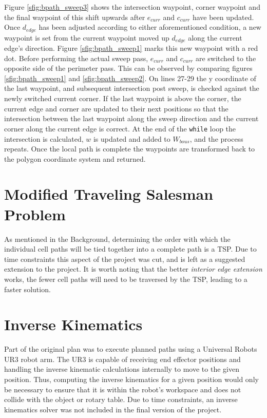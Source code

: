 Figure \ref{sfig:bpath_sweep3} shows the intersection waypoint, corner waypoint and the final waypoint of this shift upwards after $e_{curr}$ and $c_{curr}$ have been updated.
Once $d_{edge}$ has been adjusted according to either aforementioned condition, a new waypoint is set from the current waypoint moved up $d_{edge}$ along the current edge's direction.
Figure \ref{sfig:bpath_sweep1} marks this new waypoint with a red dot.
Before performing the actual sweep pass, $e_{curr}$ and $c_{curr}$ are switched to the opposite side of the perimeter pass.
This can be observed by comparing figures \ref{sfig:bpath_sweep1} and \ref{sfig:bpath_sweep2}.
On lines 27-29 the y coordinate of the last waypoint, and subsequent intersection post sweep, is checked against the newly switched current corner.
If the last waypoint is above the corner, the current edge and corner are updated to their next positions so that the intersection between the last waypoint along the sweep direction and the current corner along the current edge is correct.
At the end of the \verb|while| loop the intersection is calculated, $w$ is updated and added to $W_{bous}$, and the process repeats.
Once the local path is complete the waypoints are transformed back to the polygon coordinate system and returned.

\iftrue
\section{Modified Traveling Salesman Problem}
As mentioned in the Background, determining the order with which the individual cell paths will be tied together into a complete path is a TSP.
Due to time constraints this aspect of the project was cut, and is left as a suggested extension to the project.
It is worth noting that the better \textit{interior edge extension} works, the fewer cell paths will need to be traversed by the TSP, leading to a faster solution.
\fi

\section{Inverse Kinematics}
Part of the original plan was to execute planned paths using a Universal Robots UR3 robot arm.
The UR3 is capable of receiving end effector positions and handling the inverse kinematic calculations internally to move to the given position.
Thus, computing the inverse kinematics for a given position would only be necessary to ensure that it is within the robot's workspace and does not collide with the object or rotary table.
Due to time constraints, an inverse kinematics solver was not included in the final version of the project.

